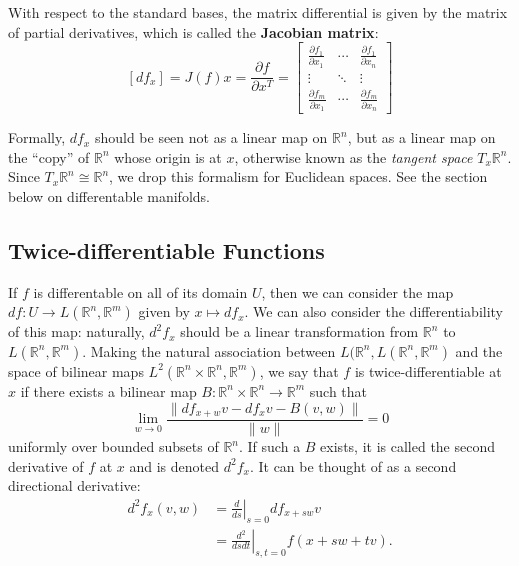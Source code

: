 \documentclass[reqno]{amsart}
\numberwithin{equation}{section}
\begin{document}
With respect to the standard bases, the matrix differential is given
by the matrix of partial derivatives, which is called the \textbf{Jacobian matrix}:
$$
    [df_x] = J(f)x =
        \frac{\partial f }{\partial x^T} =
        \begin{bmatrix} \frac{\partial f_1}{\partial x_1} & \cdots & \frac{\partial f_1}{\partial x_n} \\
        \vdots & \ddots & \vdots \\ 
        \frac{\partial f_m}{\partial x_1} & \cdots & \frac{\partial f_m}{\partial x_n}
        \end{bmatrix}
$$

Formally, $df_x$ should be seen not as a linear map on $\mathbb R^n$, but
as a linear map on the ``copy'' of $\mathbb R^n$ whose origin is at $x$, otherwise known as
the \emph{tangent space} $T_x \mathbb R^n$. Since $T_x \mathbb R^n \cong \mathbb R^n$, we
drop this formalism for Euclidean spaces. See the section below on differentable manifolds.

\subsection{Twice-differentiable Functions}

If $f$ is differentable on all of its domain $U$, then we can consider the map
$df : U \to L(\mathbb R^n, \mathbb R^m)$ given by $x \mapsto df_x$. We can also consider the
differentiability of this map: naturally, $d^2f_x$ should be a linear transformation from
$\mathbb R^n$ to $L(\mathbb R^n, \mathbb R^m)$. Making the natural association between
$L(\mathbb R^n, L(\mathbb R^n, \mathbb R^m)$ and the space of bilinear maps
$L^2(\mathbb R^n \times \mathbb R^n, \mathbb R^m)$, we say that $f$ is twice-differentiable
at $x$ if there exists a bilinear map $B: \mathbb R^n \times \mathbb R^n \to \mathbb R^m$ such that
$$
    \lim_{w \to 0} \frac{\|df_{x+w} v - df_x v - B(v, w) \|}{\|w\|} = 0
$$
uniformly over bounded subsets of $\mathbb R^n$. If such a $B$ exists, it is called the
second derivative of $f$ at $x$ and is denoted $d^2 f_x$. It can be thought of as a
second directional derivative:
\begin{align*}
    d^2f_x(v, w) &= \left. \frac{d}{ds} \right|_{s=0} df_{x + sw}v \\
        &= \left. \frac{d^2}{dsdt} \right|_{s,t=0} f(x + sw + tv).
\end{align*}
\end{document}
